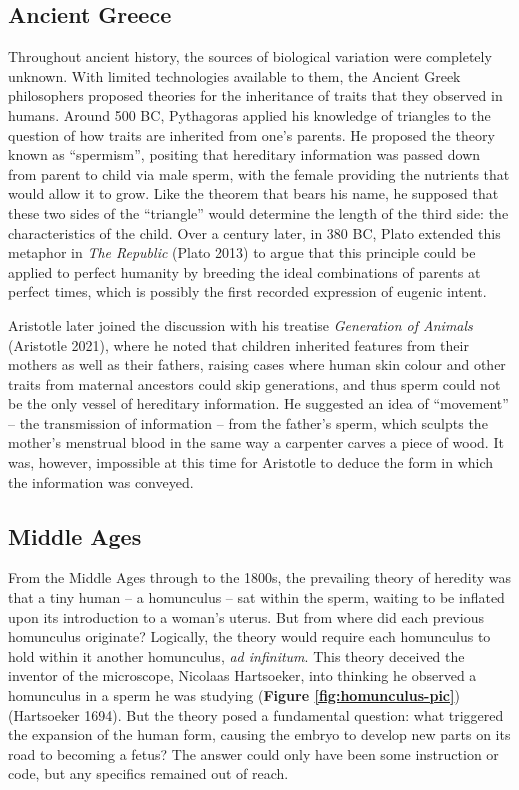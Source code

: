 \documentclass[
]{book}
\begin{document}
\hypertarget{ancient-greece}{%
\subsection{Ancient Greece}\label{ancient-greece}}

Throughout ancient history, the sources of biological variation were completely unknown. With limited technologies available to them, the Ancient Greek philosophers proposed theories for the inheritance of traits that they observed in humans. Around 500 BC, Pythagoras applied his knowledge of triangles to the question of how traits are inherited from one's parents. He proposed the theory known as ``spermism'', positing that hereditary information was passed down from parent to child via male sperm, with the female providing the nutrients that would allow it to grow. Like the theorem that bears his name, he supposed that these two sides of the ``triangle'' would determine the length of the third side: the characteristics of the child. Over a century later, in 380 BC, Plato extended this metaphor in \emph{The Republic} (Plato 2013) to argue that this principle could be applied to perfect humanity by breeding the ideal combinations of parents at perfect times, which is possibly the first recorded expression of eugenic intent.

Aristotle later joined the discussion with his treatise \emph{Generation of Animals} (Aristotle 2021), where he noted that children inherited features from their mothers as well as their fathers, raising cases where human skin colour and other traits from maternal ancestors could skip generations, and thus sperm could not be the only vessel of hereditary information. He suggested an idea of ``movement'' -- the transmission of information -- from the father's sperm, which sculpts the mother's menstrual blood in the same way a carpenter carves a piece of wood. It was, however, impossible at this time for Aristotle to deduce the form in which the information was conveyed.

\hypertarget{middle-ages}{%
\subsection{Middle Ages}\label{middle-ages}}

From the Middle Ages through to the 1800s, the prevailing theory of heredity was that a tiny human -- a homunculus -- sat within the sperm, waiting to be inflated upon its introduction to a woman's uterus. But from where did each previous homunculus originate? Logically, the theory would require each homunculus to hold within it another homunculus, \emph{ad infinitum}. This theory deceived the inventor of the microscope, Nicolaas Hartsoeker, into thinking he observed a homunculus in a sperm he was studying (\textbf{Figure \ref{fig:homunculus-pic}}) (Hartsoeker 1694). But the theory posed a fundamental question: what triggered the expansion of the human form, causing the embryo to develop new parts on its road to becoming a fetus? The answer could only have been some instruction or code, but any specifics remained out of reach.
\end{document}
